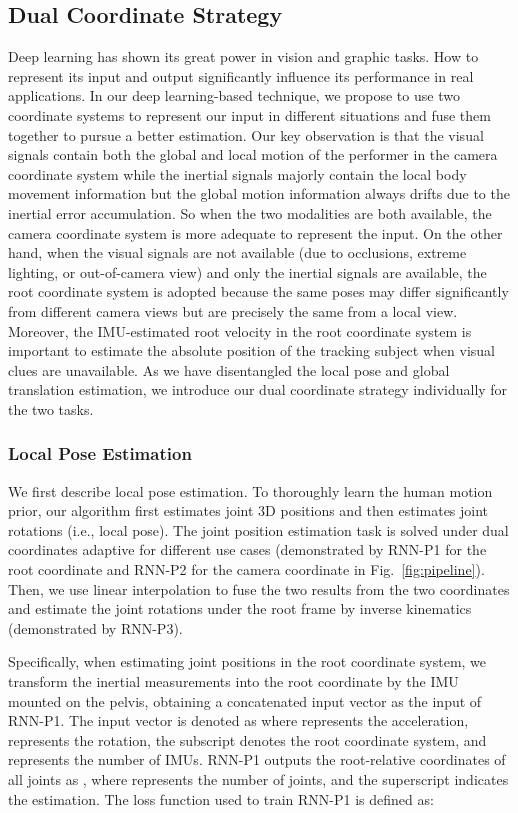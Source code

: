 \documentclass[sigconf,nonacm=true]{acmart}
\begin{document}
\subsection{Dual Coordinate Strategy}\label{subsubsec:dual-coordinate}
Deep learning has shown its great power in vision and graphic tasks.
How to represent its input and output significantly influence its performance in real applications.
In our deep learning-based technique, we propose to use two coordinate systems to represent our input in different situations and fuse them together to pursue a better estimation.
Our key observation is that the visual signals contain both the global and local motion of the performer in the camera coordinate system while the inertial signals majorly contain the local body movement information but the global motion information always drifts due to the inertial error accumulation.
So when the two modalities are both available, the camera coordinate system is more adequate to represent the input.
On the other hand, when the visual signals are not available (due to occlusions, extreme lighting, or out-of-camera view) and only the inertial signals are available, the root coordinate system is adopted because the same poses may differ significantly from different camera views but are precisely the same from a local view.
Moreover, the IMU-estimated root velocity in the root coordinate system is important to estimate the absolute position of the tracking subject when visual clues are unavailable.
As we have disentangled the local pose and global translation estimation, we introduce our dual coordinate strategy individually for the two tasks.\subsubsection{Local Pose Estimation}\label{subsubsec:Pose}
We first describe local pose estimation.
To thoroughly learn the human motion prior, our algorithm first estimates joint 3D positions and then estimates joint rotations (i.e., local pose).
The joint position estimation task is solved under dual coordinates adaptive for different use cases (demonstrated by RNN-P1 for the root coordinate and RNN-P2 for the camera coordinate in Fig.~\ref{fig:pipeline}).
Then, we use linear interpolation to fuse the two results from the two coordinates and estimate the joint rotations under the root frame by inverse kinematics (demonstrated by RNN-P3).
\par
Specifically, when estimating joint positions in the root coordinate system, we transform the inertial measurements into the root coordinate by the IMU mounted on the pelvis, obtaining a concatenated input vector as the input of RNN-P1.
The input vector is denoted as  where  represents the acceleration,  represents the rotation, the subscript  denotes the root coordinate system, and  represents the number of IMUs.
RNN-P1 outputs the root-relative coordinates of all joints as , where  represents the number of joints, and the superscript  indicates the estimation.
The loss function used to train  RNN-P1 is defined as:
\end{document}
